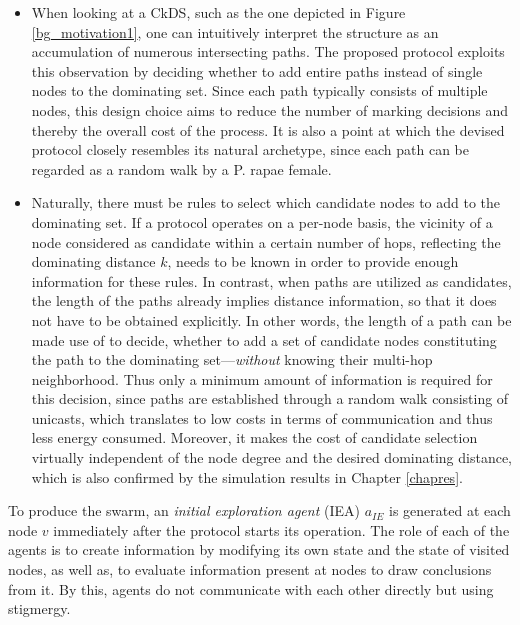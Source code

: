\begin{itemize}

\item When looking at a CkDS, such as the one depicted in Figure \ref{bg_motivation1}, one can intuitively interpret the structure as an accumulation of numerous intersecting paths. The proposed protocol exploits this observation by deciding whether to add entire paths instead of single nodes to the dominating set. Since each path typically consists of multiple nodes, this design choice aims to reduce the number of marking decisions and thereby the overall cost of the process. It is also a point at which the devised protocol closely resembles its natural archetype, since each path can be regarded as a random walk by a P. rapae female.

\item Naturally, there must be rules to select which candidate nodes to add to the dominating set. If a protocol operates on a per-node basis, the vicinity of a node considered as candidate within a certain number of hops, reflecting the dominating distance $k$, needs to be known in order to provide enough information for these rules. In contrast, when paths are utilized as candidates, the length of the paths already implies distance information, so that it does not have to be obtained explicitly. In other words, the length of a path can be made use of to decide, whether to add a set of candidate nodes constituting the path to the dominating set---\emph{without} knowing their multi-hop neighborhood. Thus only a minimum amount of information is required for this decision, since paths are established through a random walk consisting of unicasts, which translates to low costs in terms of communication and thus less energy consumed. Moreover, it makes the cost of candidate selection virtually independent of the node degree and the desired dominating distance, which is also confirmed by the simulation results in Chapter \ref{chapres}.

\end{itemize}


To produce the swarm, an \emph{initial exploration agent} (IEA) $a_{IE}$ is generated at each node $v$ immediately after the protocol starts its operation. The role of each of the agents is to create information by modifying its own state and the state of visited nodes, as well as, to evaluate information present at nodes to draw conclusions from it. By this, agents do not communicate with each other directly but using stigmergy. 

